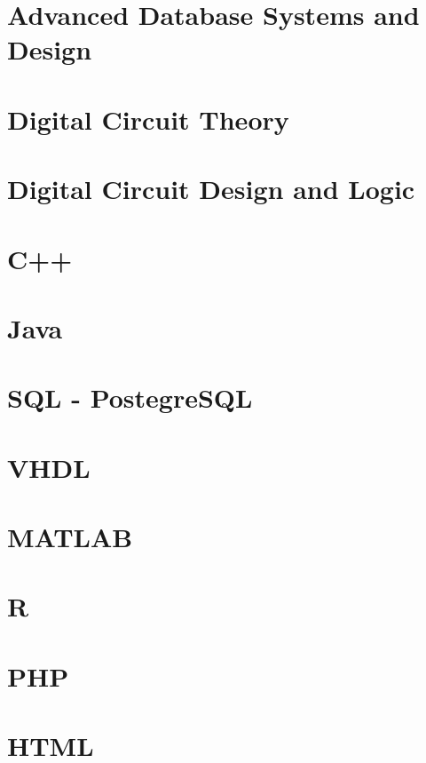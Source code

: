 \documentclass[12pt, letterpaper]{memoir}
\begin{document}
\part{Advanced Database Systems and Design}

%


\part{Digital Circuit Theory}

%

\part{Digital Circuit Design and Logic}

%


\part{C++}

\part{Java}

\part{SQL - PostegreSQL}

\part{VHDL}

\part{MATLAB}

\part{R}

\part{PHP}

\part{HTML}
\end{document}
